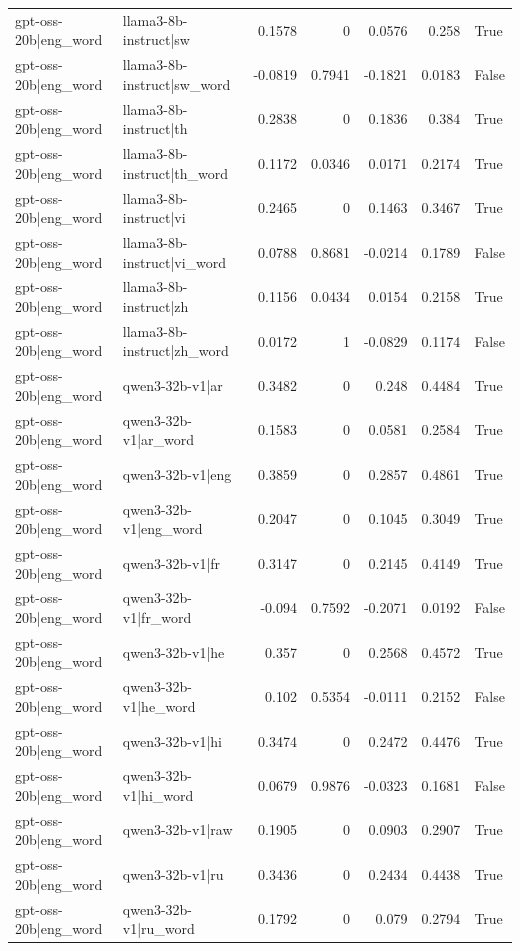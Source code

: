 \begin{table}
\begin{tabular}{l l r r r r l}
gpt-oss-20b|eng_word & llama3-8b-instruct|sw & 0.1578 & 0 & 0.0576 & 0.258 & True \\
gpt-oss-20b|eng_word & llama3-8b-instruct|sw_word & -0.0819 & 0.7941 & -0.1821 & 0.0183 & False \\
gpt-oss-20b|eng_word & llama3-8b-instruct|th & 0.2838 & 0 & 0.1836 & 0.384 & True \\
gpt-oss-20b|eng_word & llama3-8b-instruct|th_word & 0.1172 & 0.0346 & 0.0171 & 0.2174 & True \\
gpt-oss-20b|eng_word & llama3-8b-instruct|vi & 0.2465 & 0 & 0.1463 & 0.3467 & True \\
gpt-oss-20b|eng_word & llama3-8b-instruct|vi_word & 0.0788 & 0.8681 & -0.0214 & 0.1789 & False \\
gpt-oss-20b|eng_word & llama3-8b-instruct|zh & 0.1156 & 0.0434 & 0.0154 & 0.2158 & True \\
gpt-oss-20b|eng_word & llama3-8b-instruct|zh_word & 0.0172 & 1 & -0.0829 & 0.1174 & False \\
gpt-oss-20b|eng_word & qwen3-32b-v1|ar & 0.3482 & 0 & 0.248 & 0.4484 & True \\
gpt-oss-20b|eng_word & qwen3-32b-v1|ar_word & 0.1583 & 0 & 0.0581 & 0.2584 & True \\
gpt-oss-20b|eng_word & qwen3-32b-v1|eng & 0.3859 & 0 & 0.2857 & 0.4861 & True \\
gpt-oss-20b|eng_word & qwen3-32b-v1|eng_word & 0.2047 & 0 & 0.1045 & 0.3049 & True \\
gpt-oss-20b|eng_word & qwen3-32b-v1|fr & 0.3147 & 0 & 0.2145 & 0.4149 & True \\
gpt-oss-20b|eng_word & qwen3-32b-v1|fr_word & -0.094 & 0.7592 & -0.2071 & 0.0192 & False \\
gpt-oss-20b|eng_word & qwen3-32b-v1|he & 0.357 & 0 & 0.2568 & 0.4572 & True \\
gpt-oss-20b|eng_word & qwen3-32b-v1|he_word & 0.102 & 0.5354 & -0.0111 & 0.2152 & False \\
gpt-oss-20b|eng_word & qwen3-32b-v1|hi & 0.3474 & 0 & 0.2472 & 0.4476 & True \\
gpt-oss-20b|eng_word & qwen3-32b-v1|hi_word & 0.0679 & 0.9876 & -0.0323 & 0.1681 & False \\
gpt-oss-20b|eng_word & qwen3-32b-v1|raw & 0.1905 & 0 & 0.0903 & 0.2907 & True \\
gpt-oss-20b|eng_word & qwen3-32b-v1|ru & 0.3436 & 0 & 0.2434 & 0.4438 & True \\
gpt-oss-20b|eng_word & qwen3-32b-v1|ru_word & 0.1792 & 0 & 0.079 & 0.2794 & True \\

\end{tabular}
\end{table}
